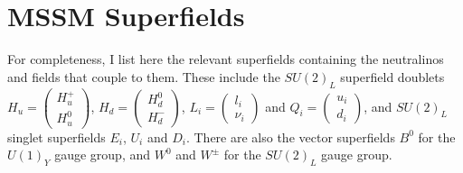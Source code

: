 \documentclass[english, notitlepage]{article}
\begin{document}
\section{MSSM Superfields}
    For completeness, I list here the relevant superfields containing the
    neutralinos and fields that couple to them. These include the $SU(2)_L$
    superfield doublets $H_u = \begin{pmatrix} H_u^+ \\ H_u^0 \end{pmatrix}$, $H_d = \begin{pmatrix} H_d^0 \\ H_d^- \end{pmatrix}$, $L_i = \begin{pmatrix} l_i \\ \nu_i \end{pmatrix}$ and $Q_i = \begin{pmatrix} u_i \\ d_i \end{pmatrix}$, and $SU(2)_L$ singlet superfields $E_i$, $U_i$ and $D_i$. There are also the vector superfields $B^0$ for the $U(1)_Y$ gauge group, and $W^0$ and $W^\pm$ for the $SU(2)_L$ gauge group.
\end{document}
